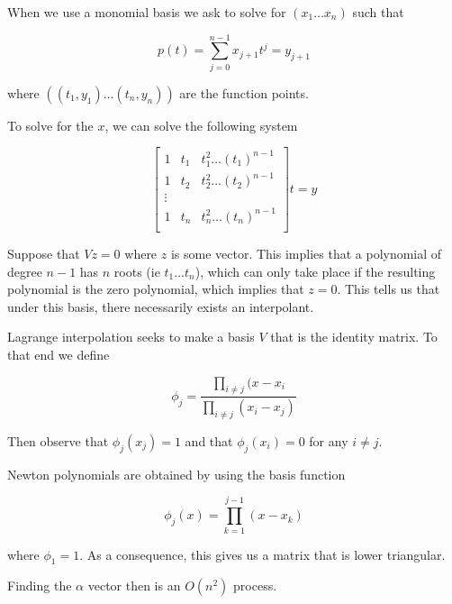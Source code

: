 \documentclass[../main.tex]{subfiles}
\begin{document}
\begin{definition}
    When we use a monomial basis we ask to solve for $(x_1 \dots x_n)$ such that


    \[
        p(t) = \sum_{j=0}^{n-1}x_{j+1}t^{j} = y_{j+1}
    \]

    where $\left( (t_1, y_1) \dots (t_n,y_n) \right)$ are the function points.

    To solve for the $x$, we can solve the following system


    \[
        \begin{bmatrix}
            1 & t_1 & t_1^2 \dots (t_1)^{n-1} \\
            1 & t_2 & t_2^2 \dots (t_2)^{n-1} \\
            \vdots \\
            1 & t_n & t_n^2 \dots (t_n)^{n-1} \\
        \end{bmatrix} t = y
    \]

    Suppose that $Vz = 0$ where $z$ is some vector. This implies that a polynomial of degree $n-1$ has $n$ roots (ie $t_1 \dots t_n$), which can only take place if the resulting polynomial is the zero polynomial, which implies that $z = 0$. This tells us that under this basis, there necessarily exists an interpolant.
\end{definition}
\begin{definition}
    Lagrange interpolation seeks to make a basis $V$ that is the identity matrix. To that end we define

    \[
        \phi_j = \frac{\prod_{i \not = j}(x - x_i}{\prod_{i \not = j}(x_i - x_j)}
    \]

    Then observe that $\phi_j(x_j) = 1$ and that $\phi_j(x_i) = 0$ for any $i \not= j$.
\end{definition}

\begin{definition}
    Newton polynomials are obtained by using the basis function

    \[
        \phi_{j}(x) = \prod_{k=1}^{j-1}(x - x_k)
    \]

    where $\phi_1  = 1$. As a consequence, this gives us a matrix
    that is lower triangular.

    Finding the $\alpha$ vector then is an $O(n^2)$ process.

\end{definition}
\end{document}
